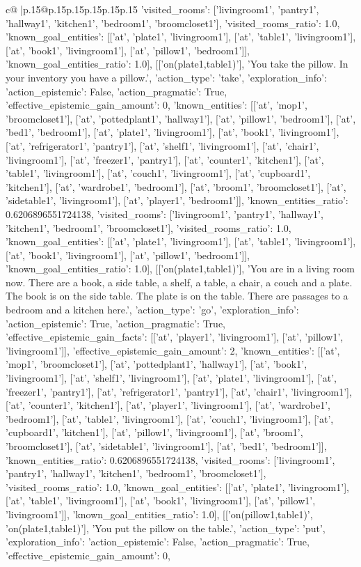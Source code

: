 \documentclass{article}
\begin{document}
{\begin{supertabular}{c@{$\;$}|p{.15\linewidth}@{}p{.15\linewidth}p{.15\linewidth}p{.15\linewidth}p{.15\linewidth}p{.15\linewidth}}
{{{'visited_rooms': ['livingroom1', 'pantry1', 'hallway1', 'kitchen1', 'bedroom1', 'broomcloset1'], 'visited_rooms_ratio': 1.0, 'known_goal_entities': [['at', 'plate1', 'livingroom1'], ['at', 'table1', 'livingroom1'], ['at', 'book1', 'livingroom1'], ['at', 'pillow1', 'bedroom1']], 'known_goal_entities_ratio': 1.0}}], [['on(plate1,table1)'], 'You take the pillow. In your inventory you have a pillow.', {'action_type': 'take', 'exploration_info': {'action_epistemic': False, 'action_pragmatic': True, 'effective_epistemic_gain_amount': 0, 'known_entities': [['at', 'mop1', 'broomcloset1'], ['at', 'pottedplant1', 'hallway1'], ['at', 'pillow1', 'bedroom1'], ['at', 'bed1', 'bedroom1'], ['at', 'plate1', 'livingroom1'], ['at', 'book1', 'livingroom1'], ['at', 'refrigerator1', 'pantry1'], ['at', 'shelf1', 'livingroom1'], ['at', 'chair1', 'livingroom1'], ['at', 'freezer1', 'pantry1'], ['at', 'counter1', 'kitchen1'], ['at', 'table1', 'livingroom1'], ['at', 'couch1', 'livingroom1'], ['at', 'cupboard1', 'kitchen1'], ['at', 'wardrobe1', 'bedroom1'], ['at', 'broom1', 'broomcloset1'], ['at', 'sidetable1', 'livingroom1'], ['at', 'player1', 'bedroom1']], 'known_entities_ratio': 0.6206896551724138, 'visited_rooms': ['livingroom1', 'pantry1', 'hallway1', 'kitchen1', 'bedroom1', 'broomcloset1'], 'visited_rooms_ratio': 1.0, 'known_goal_entities': [['at', 'plate1', 'livingroom1'], ['at', 'table1', 'livingroom1'], ['at', 'book1', 'livingroom1'], ['at', 'pillow1', 'bedroom1']], 'known_goal_entities_ratio': 1.0}}], [['on(plate1,table1)'], 'You are in a living room now. There are a book, a side table, a shelf, a table, a chair, a couch and a plate. The book is on the side table. The plate is on the table. There are passages to a bedroom and a kitchen here.', {'action_type': 'go', 'exploration_info': {'action_epistemic': True, 'action_pragmatic': True, 'effective_epistemic_gain_facts': [['at', 'player1', 'livingroom1'], ['at', 'pillow1', 'livingroom1']], 'effective_epistemic_gain_amount': 2, 'known_entities': [['at', 'mop1', 'broomcloset1'], ['at', 'pottedplant1', 'hallway1'], ['at', 'book1', 'livingroom1'], ['at', 'shelf1', 'livingroom1'], ['at', 'plate1', 'livingroom1'], ['at', 'freezer1', 'pantry1'], ['at', 'refrigerator1', 'pantry1'], ['at', 'chair1', 'livingroom1'], ['at', 'counter1', 'kitchen1'], ['at', 'player1', 'livingroom1'], ['at', 'wardrobe1', 'bedroom1'], ['at', 'table1', 'livingroom1'], ['at', 'couch1', 'livingroom1'], ['at', 'cupboard1', 'kitchen1'], ['at', 'pillow1', 'livingroom1'], ['at', 'broom1', 'broomcloset1'], ['at', 'sidetable1', 'livingroom1'], ['at', 'bed1', 'bedroom1']], 'known_entities_ratio': 0.6206896551724138, 'visited_rooms': ['livingroom1', 'pantry1', 'hallway1', 'kitchen1', 'bedroom1', 'broomcloset1'], 'visited_rooms_ratio': 1.0, 'known_goal_entities': [['at', 'plate1', 'livingroom1'], ['at', 'table1', 'livingroom1'], ['at', 'book1', 'livingroom1'], ['at', 'pillow1', 'livingroom1']], 'known_goal_entities_ratio': 1.0}}], [['on(pillow1,table1)', 'on(plate1,table1)'], 'You put the pillow on the table.', {'action_type': 'put', 'exploration_info': {'action_epistemic': False, 'action_pragmatic': True, 'effective_epistemic_gain_amount': 0, }}}
\end{supertabular}}
\end{document}
